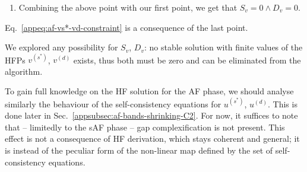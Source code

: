 \begin{tabproof}
\begin{enumerate}
	\paragraph{Proof.}
	
	To prove this, assume the contrary and use the point above to reduce  Eq.~\eqref{appeq:saf-B2-4AC-relation-int1} to
	\[
		A=C
		\quad\implies\quad
		V = \frac{B+2C}{B^2 - 4C^2} = \frac{1}{B-2C} \, .
	\]
	Inserting the latter in Eq.~\eqref{appeq:saf-Dv-sc-ABC},
	\[
	\begin{aligned}
		\left( 1+\frac{2C}{B-2C} \right) D_v + \frac{B}{B-2C} S_v &= 0 \\
		\frac{B}{B-2C} D_v + \frac{B}{B-2C} S_v &= 0 \, ,
	\end{aligned} 
	\]
	which implies
	\[
		D_v + S_v = 0
		\quad\implies\quad
		v^{(s^*)} = 0 \, .
	\]
	Recalling from Tab.~\ref{tab:af-ehm-vgamma-self-consistencies} the explicit self-consistency equation for $v^{(d)}$ and setting $v^{(s^*)} = 0$,
	\[
		v^{(d)} = - V v^{(d)} F\left[ (c_x-c_y)^2 \right] \, ,
	\]
	and using the positivity rule of Eq.~\eqref{appeq:saf-F-positivity} we get
	\[
		V > 0 \qq{and} F\left[ (c_x-c_y)^2 \right] \ge 0
		\quad\implies\quad
		v^{(d)} = 0 \, ,
	\]
	because no finite positive number can equal any finite negative number, and \textit{viceversa}. Thus
	\[
		S_v \neq 0 \qq{and} D_v \neq 0
		\quad\implies\quad
		v^{(s^*)} = v^{(d)} = 0
		\quad\implies\quad
		S_v = D_v = 0 \, .
	\]
	Absurd.
	\item Combining the above point with our first point, we get that $S_v = 0 \land D_v = 0$.
\end{enumerate}
Eq.~\eqref{appeq:af-vs*-vd-constraint} is a consequence of the last point.
\end{tabproof}

We explored any possibility for $S_v$, $D_v$: no stable solution with finite values of the HFPs $v^{(s^*)}$, $v^{(d)}$ exists, thus both must be zero and can be eliminated from the algorithm.

To gain full knowledge on the HF solution for the AF phase, we should analyse similarly the behaviour of the self-consistency equations for $u^{(s^*)}$, $u^{(d)}$. This is done later in Sec.~\ref{appsubsec:af-bands-shrinking-C2}. For now, it suffices to note that -- limitedly to the sAF phase -- gap complexification is not present. This effect is not a consequence of HF derivation, which stays coherent and general; it is instead of the peculiar form of the non-linear map defined by the set of self-consistency equations.

